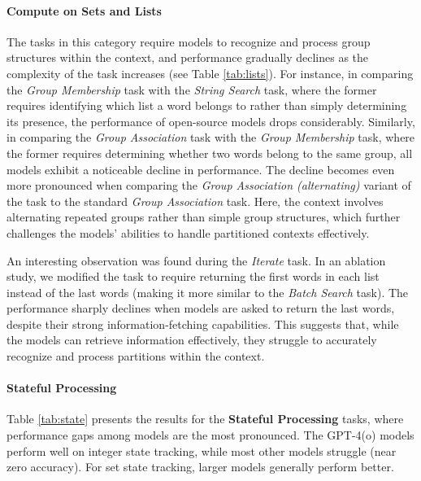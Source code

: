 \paragraph{Compute on Sets and Lists}
The tasks in this category require models to recognize and process group structures within the context, and performance gradually declines as the complexity of the task increases (see Table \ref{tab:lists}). For instance, in comparing the \textit{Group Membership} task with the \textit{String Search} task, where the former requires identifying which list a word belongs to rather than simply determining its presence, the performance of open-source models drops considerably. Similarly, in comparing the \textit{Group Association} task with the \textit{Group Membership} task, where the former requires determining whether two words belong to the same group, all models exhibit a noticeable decline in performance. The decline becomes even more pronounced when comparing the \textit{ Group Association (alternating)} variant of the task to the standard \textit{Group Association} task. Here, the context involves alternating repeated groups rather than simple group structures, which further challenges the models' abilities to handle partitioned contexts effectively.

An interesting observation was found during the \textit{Iterate} task. In an ablation study, we modified the task to require returning the first words in each list instead of the last words (making it more similar to the \textit{Batch Search} task). The performance sharply declines when models are asked to return the last words, despite their strong information-fetching capabilities. This suggests that, while the models can retrieve information effectively, they struggle to accurately recognize and process partitions within the context.



\paragraph{Stateful Processing}



Table \ref{tab:state} presents the results for the \textbf{Stateful Processing} tasks, where performance gaps among models are the most pronounced. The GPT-4(o) models perform well on integer state tracking, while most other models struggle (near zero accuracy). For set state tracking, larger models generally perform better.

